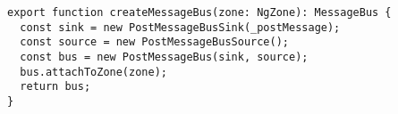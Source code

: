 \begin{verbatim}
export function createMessageBus(zone: NgZone): MessageBus {
  const sink = new PostMessageBusSink(_postMessage);
  const source = new PostMessageBusSource();
  const bus = new PostMessageBus(sink, source);
  bus.attachToZone(zone);
  return bus;
}
\end{verbatim}
